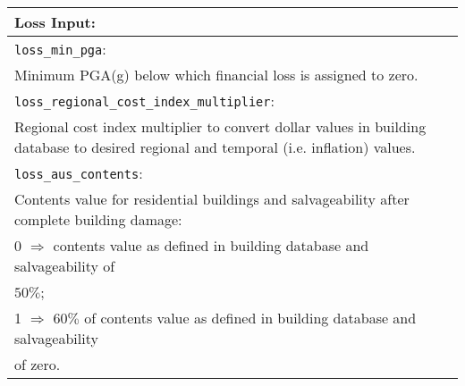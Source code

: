 \documentclass[a4paper, 12pt]{report}
\begin{document}
\vspace{2em}
\begin{tabular}{|p{\textwidth}|}
\hline
\vspace{0.3em} \noindent \Large \textbf{Loss Input:} \normalsize \\
\hline \vspace{0.1em} \texttt{loss\_min\_pga}: \\
Minimum PGA(g) below which financial loss is assigned to zero. \\
 \hline
\vspace{0.1em} \texttt{loss\_regional\_cost\_index\_multiplier}: \\
Regional cost index multiplier to convert dollar values in building
database to desired regional and temporal (i.e. inflation) values.\\
\hline \vspace{0.1em} \texttt{loss\_aus\_contents}: \\
Contents value for residential buildings and salvageability after complete building damage:   \\
\hspace{0.5em} 0 $\Rightarrow$ contents value as defined in building
  database and salvageability of \\
  \hspace{2.5em} $50\%$;\\
\hspace{0.5em} 1 $\Rightarrow$ $60\%$ of contents value as defined in
building database and salvageability \\
\hspace{2.5em} of zero.\\
  \hline
 \end{tabular}
\end{document}

